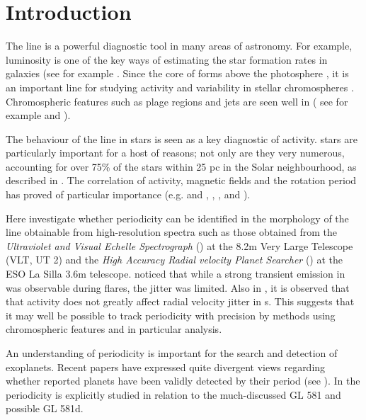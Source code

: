\chapter{Introduction} %
\protect\label{chapter:introduction}

The {\ha} line is a powerful diagnostic tool in many areas of astronomy. For example, {\ha} luminosity is one of the key
ways of estimating the star formation rates in galaxies (see for example \citet{rosagonzalez02}.  Since the core of
{\ha} forms above the photosphere \citep{vernazza81}, it is an important line for studying activity and variability in
stellar chromospheres \citep{hall08}. Chromospheric features such as plage regions and jets are seen well in {\ha} ( see
for example \citet{kneer10} and \citet{kuridze11}).

The behaviour of the {\ha} line in {\rdwarf} stars is seen as a key diagnostic of activity. {\rdwarf} stars are
particularly important for a host of reasons; not only are they very numerous, accounting for over 75\% of the stars
within 25 pc in the Solar neighbourhood, as described in \citet{winters15}. The correlation of activity, magnetic fields
and the rotation period has proved of particular importance (e.g. \citet{charbonneau97} and \citet{delfosse97},
\citet{mohanty02}, \citet{mohanty03}, \citet{reiners08} and \citet{schmidt14}).

Here {\Firstp} investigate whether periodicity can be identified in the morphology of the {\ha} line obtainable from
high-resolution spectra such as those obtained from the \textit{Ultraviolet and Visual Echelle Spectrograph} ({\uves})
at the 8.2m Very Large Telescope (VLT, UT 2) and the \textit{High Accuracy Radial velocity Planet Searcher} ({\harps})
at the ESO La Silla 3.6m telescope.  \citet{barnes14} noticed that while a strong transient emission in {\ha} was
observable during flares, the jitter was limited. Also in \citet{reiners09}, it is observed that that activity does not
greatly affect radial velocity jitter in \rdwarf s. This suggests that it may well be possible to track periodicity with
precision by methods using chromospheric features and in particular {\ha} analysis.

An understanding of periodicity is important for the search and detection of exoplanets. Recent papers have expressed
quite divergent views regarding whether reported planets have been validly detected by their period (see
\citealt{barnes13,robertson14,robertson14a,tuomi13aug,robertson15}). In \citet{hatzes15} the {\ha} periodicity is 
explicitly studied in relation to the much-discussed GL 581 and possible GL 581d.

